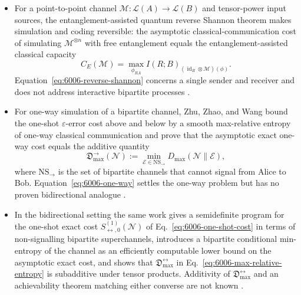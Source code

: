 \begin{itemize}
  \item For a point-to-point channel $\mathcal M:\mathcal L(A)\to\mathcal L(B)$
  and tensor-power input sources, the entanglement-assisted quantum reverse
  Shannon theorem makes simulation and coding reversible: the asymptotic
  classical-communication cost of simulating $\mathcal M^{\otimes n}$ with
  free entanglement equals the entanglement-assisted classical capacity
  \begin{equation}
    C_E(\mathcal M)
    =\max_{\phi_{RA}}I(R;B)_{(\operatorname{id}_R\otimes\mathcal M)(\phi)}.
    \label{eq:6006-reverse-shannon}
  \end{equation}
  Equation~\eqref{eq:6006-reverse-shannon} concerns a single sender and
  receiver and does not address interactive bipartite processes
  .

  \item For one-way simulation of a bipartite channel, Zhu, Zhao, and Wang
  bound the one-shot $\varepsilon$-error cost above and below by a smooth
  max-relative entropy of one-way classical communication and prove that
  the asymptotic exact one-way cost equals the additive quantity
  \begin{equation}
    \mathfrak D^{\to}_{\max}(\mathcal N)
    :=\min_{\mathcal E\in\mathrm{NS}_\to}D_{\max}(\mathcal N\|\mathcal E),
    \label{eq:6006-one-way}
  \end{equation}
  where $\mathrm{NS}_\to$ is the set of bipartite channels that cannot
  signal from Alice to Bob.  Equation~\eqref{eq:6006-one-way} settles the
  one-way problem but has no proven bidirectional analogue
  .

  \item In the bidirectional setting the same work gives a semidefinite
  program for the one-shot exact cost
  $S^{(1)}_{\leftrightarrow,0}(\mathcal N)$ of
  Eq.~\eqref{eq:6006-one-shot-cost} in terms of non-signalling bipartite
  superchannels, introduces a bipartite conditional min-entropy of the
  channel as an efficiently computable lower bound on the asymptotic exact
  cost, and shows that
  $\mathfrak D^{\leftrightarrow}_{\max}$ in
  Eq.~\eqref{eq:6006-max-relative-entropy} is subadditive under tensor
  products.  Additivity of $\mathfrak D^{\leftrightarrow}_{\max}$ and an
  achievability theorem matching either converse are not known
  .
\end{itemize}


